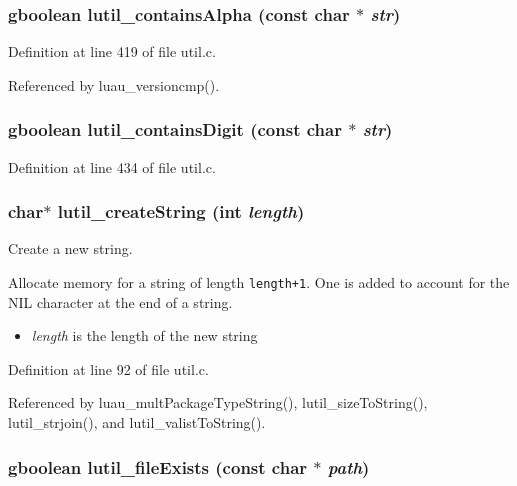 \subsubsection{\setlength{\rightskip}{0pt plus 5cm}gboolean lutil\_\-contains\-Alpha (const char $\ast$ {\em str})}\label{util_8h_a23}




Definition at line 419 of file util.c.

Referenced by luau\_\-versioncmp().
\subsubsection{\setlength{\rightskip}{0pt plus 5cm}gboolean lutil\_\-contains\-Digit (const char $\ast$ {\em str})}\label{util_8h_a24}




Definition at line 434 of file util.c.
\subsubsection{\setlength{\rightskip}{0pt plus 5cm}char$\ast$ lutil\_\-create\-String (int {\em length})}\label{util_8h_a12}


Create a new string. 

Allocate memory for a string of length {\tt length+1}. One is added to account for the NIL character at the end of a string.

\begin{itemize}
\item {\em length\/} is the length of the new string 
\end{itemize}


Definition at line 92 of file util.c.

Referenced by luau\_\-mult\-Package\-Type\-String(), lutil\_\-size\-To\-String(), lutil\_\-strjoin(), and lutil\_\-valist\-To\-String().
\subsubsection{\setlength{\rightskip}{0pt plus 5cm}gboolean lutil\_\-file\-Exists (const char $\ast$ {\em path})}\label{util_8h_a27}


